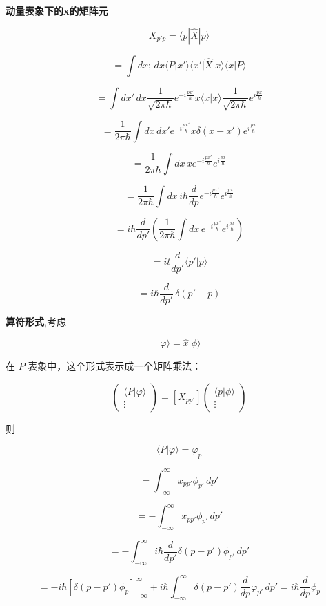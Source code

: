 \documentclass[lang=cn,10pt]{elegantbook}
\begin{document}
\textbf{动量表象下的x的矩阵元}

\[
X_{p'p} = \langle p | \hat{X} | p \rangle
\]

\[
= \int dx; \, dx \langle P | x' \rangle \langle x' | \hat{X} | x \rangle \langle x | P \rangle
\]

\[
= \int dx' \, dx \frac{1}{\sqrt{2\pi \hbar}} e^{-i \frac{p x'}{\hbar}} x \langle x | x \rangle \frac{1}{\sqrt{2\pi \hbar}} e^{i \frac{p x}{\hbar}}
\]

\[
= \frac{1}{2\pi \hbar} \int dx \, dx' e^{-i \frac{p x'}{\hbar}} x \delta(x - x') e^{i \frac{p x}{\hbar}}
\]

\[
= \frac{1}{2\pi \hbar} \int dx \, x e^{-i \frac{p x'}{\hbar}} e^{i \frac{p x}{\hbar}}
\]

\[
= \frac{1}{2\pi \hbar} \int dx \, i\hbar \frac{d}{dp} e^{-i \frac{p x'}{\hbar}} e^{i \frac{p x}{\hbar}}
\]

\[
= i\hbar \frac{d}{dp'} \left( \frac{1}{2\pi \hbar} \int dx \, e^{-i \frac{p x'}{\hbar}} e^{i \frac{p x}{\hbar}} \right)
\]

\[
= it \frac{d}{dp'} \langle p' | p \rangle
\]

\[
= i \hbar \frac{d}{dp'}  \, \delta( p' - p)
\]

\textbf{算符形式},考虑

\[
| \varphi \rangle = \hat{x} | \phi \rangle
\]

在 $P$ 表象中，这个形式表示成一个矩阵乘法：

\[
\begin{pmatrix}
	\langle P | \varphi \rangle \\
	\vdots
\end{pmatrix} = [X_{pp'}]
\begin{pmatrix}
	\langle p | \phi \rangle \\
	\vdots
\end{pmatrix}
\]

则 

\[
\langle P | \varphi \rangle = \varphi_p
\]

\[
= \int_{-\infty}^{\infty} x_{pp'} \phi_{p'} \, dp'
\]

\[
= -\int_{-\infty}^{\infty} x_{pp'} \phi_{p'} \, dp'
\]

\[
= -\int_{-\infty}^{\infty} i \hbar \frac{d}{dp'} \delta(p - p') \phi_{p'} \, dp'
\]

\[
= -i \hbar \left[ \delta(p - p') \phi_p \right]_{-\infty}^{\infty} + i \hbar \int_{-\infty}^{\infty} \delta(p - p') \frac{d}{dp} \varphi_{p'} \, dp'=i\hbar\frac{d}{dp}\phi_p
\]
\end{document}
